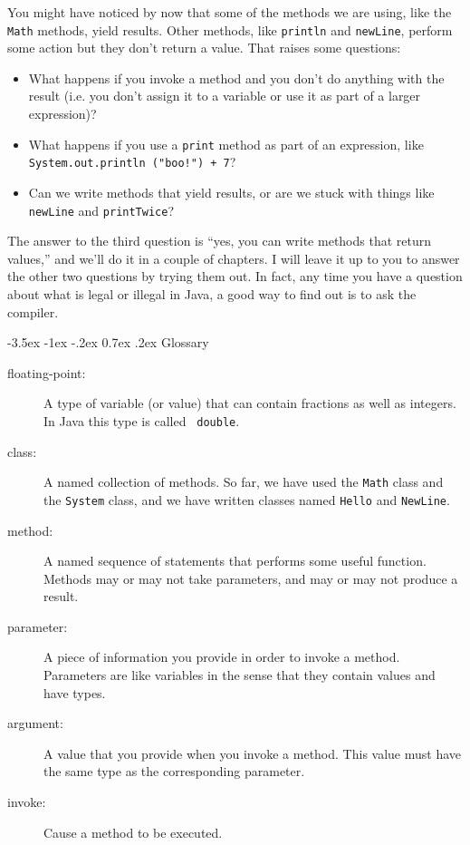 \documentclass{book}
\makeatletter
\renewcommand{\section}{\@startsection 
    {section} {1} {0mm}%
    {-3.5ex \@plus -1ex \@minus -.2ex}%
    {0.7ex \@plus.2ex}%
    {\normalfont\Large\bfseries}}
\makeatother
\begin{document}
You might have noticed by now that some of the methods we are using,
like the {\tt Math} methods, yield results.  Other methods,
like {\tt println} and {\tt newLine}, perform some action but
they don't return a value.  That raises some questions:

\begin{itemize}

\item What happens if you invoke a method and you don't
do anything with the result (i.e. you don't assign it to
a variable or use it as part of a larger expression)?

\item What happens if you use a {\tt print} method as part
of an expression, like {\tt System.out.println ("boo!") + 7}?

\item Can we write methods that yield results, or are we
stuck with things like {\tt newLine} and {\tt printTwice}?

\end{itemize}

The answer to the third question is ``yes, you can write methods that
return values,'' and we'll do it in a couple of chapters.  I will
leave it up to you to answer the other two questions by trying them
out.  In fact, any time you have a question about what is legal or
illegal in Java, a good way to find out is to ask the compiler.


\section{Glossary}

\begin{description}

\item[floating-point:] A type of variable (or value) that can contain
fractions as well as integers.  In Java this type is called {\tt
double}.

\item[class:]  A named collection of methods.  So far, we have used
the {\tt Math} class and the {\tt System} class, and we have
written classes named {\tt Hello} and {\tt NewLine}.

\item[method:]  A named sequence of statements that performs some
useful function.  Methods may or may not take parameters, and may
or may not produce a result.

\item[parameter:]  A piece of information you provide
in order to invoke a method.  Parameters are like variables in
the sense that they contain values and have types.

\item[argument:]  A value that you provide when you invoke a
method.  This value must have the same type as the corresponding
parameter.

\item[invoke:]  Cause a method to be executed.


\end{description}
\end{document}
